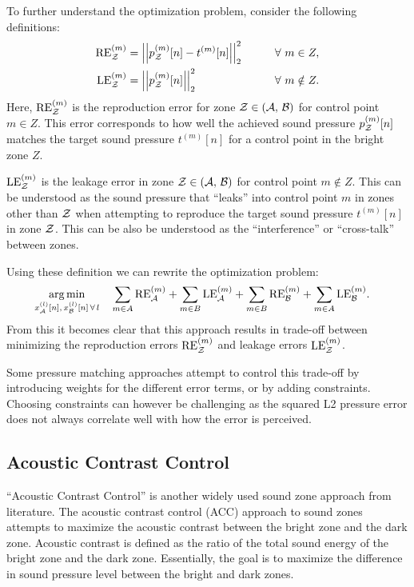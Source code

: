 To further understand the optimization problem, consider the following definitions: 
\begin{alignat}{2}
    \text{RE}^{(m)}_\zz &= \norm[2][2]{p_\zz^{(m)}[n] - t^{(m)}[n]} \qquad&& \forall\,\, m\in Z, \label{eq:sound_zone:approaches:RE}\\
    \text{LE}^{(m)}_\zz &= \norm[2][2]{p_\zz^{(m)}[n]} \qquad&& \forall\,\, m\notin Z. \label{eq:sound_zone:approaches:LE} 
\end{alignat}
Here, $\text{RE}^{(m)}_{\mathcal{Z}}$ is the reproduction error for zone $\mathcal{Z} \in \left(\mathcal{A},\,\mathcal{B}\right)$ for control point $m \in Z$.
This error corresponds to how well the achieved sound pressure $p_{\mathcal{Z}}^{(m)}[n]$ matches the target sound pressure $t^{(m)}[n]$ for a control point in the 
bright zone $Z$. 

$\text{LE}^{(m)}_{\mathcal{Z}}$ is the leakage error in zone $\mathcal{Z} \in \left(\mathcal{A},\,\mathcal{B}\right)$ for control point $m \notin Z$.
This can be understood as the sound pressure that ``leaks'' into control point $m$ in zones other than $\mathcal{Z}$ when attempting to 
reproduce the target sound pressure $t^{(m)}[n]$ in zone $\mathcal{Z}$. 
This can be also be understood as the ``interference'' or ``cross-talk'' between zones.

Using these definition we can rewrite the optimization problem:
\begin{align}
    \operatorname*{arg\,min}_{x_{\mathcal{A}}^{(l)}[n],\,x_{\mathcal{B}}^{(l)}[n]\,\forall\,l}\quad 
       &\sum_{m\in A} \text{RE}^{(m)}_{\mathcal{A}} +  \sum_{m\in B} \text{LE}^{(m)}_{\mathcal{A}} + \sum_{m\in B} \text{RE}^{(m)}_{\mathcal{B}} + \sum_{m\in A} \text{LE}^{(m)}_{\mathcal{B}}
   .
\end{align}
From this it becomes clear that this approach results in trade-off between minimizing the reproduction errors $\text{RE}^{(m)}_{\mathcal{Z}}$ 
and leakage errors $\text{LE}^{(m)}_{\mathcal{Z}}$. 

Some pressure matching approaches attempt to control this trade-off by introducing weights for the different error terms, 
or by adding constraints.
Choosing constraints can however be challenging as the squared L2 pressure error does not always correlate well with how
the error is perceived.

\subsection{Acoustic Contrast Control}
\label{ch:sound_zone:approaches:acoustic_contrast_control}
``Acoustic Contrast Control'' is another widely used sound zone approach from literature.
The acoustic contrast control (ACC) approach to sound zones attempts to maximize the acoustic contrast between the bright zone and the dark zone. 
Acoustic contrast is defined as the ratio of the total sound energy of the bright zone and the dark zone.
Essentially, the goal is to maximize the difference in sound pressure level between the bright and dark zones.

